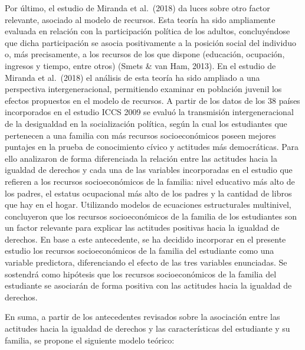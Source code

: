 \documentclass[12pt,twoside]{templates/facsothesis}
\begin{document}
Por último, el estudio de Miranda et al.~(2018) da luces sobre otro factor relevante, asociado al modelo de recursos. Esta teoría ha sido ampliamente evaluada en relación con la participación política de los adultos, concluyéndose que dicha participación se asocia positivamente a la posición social del individuo o, más precisamente, a los recursos de los que dispone (educación, ocupación, ingresos y tiempo, entre otros) (Smets \& van Ham, 2013). En el estudio de Miranda et al.~(2018) el análisis de esta teoría ha sido ampliado a una perspectiva intergeneracional, permitiendo examinar en población juvenil los efectos propuestos en el modelo de recursos. A partir de los datos de los 38 países incorporados en el estudio ICCS 2009 se evaluó la transmisión intergeneracional de la desigualdad en la socialización política, según la cual los estudiantes que pertenecen a una familia con más recursos socioeconómicos poseen mejores puntajes en la prueba de conocimiento cívico y actitudes más democráticas. Para ello analizaron de forma diferenciada la relación entre las actitudes hacia la igualdad de derechos y cada una de las variables incorporadas en el estudio que refieren a los recursos socioeconómicos de la familia: nivel educativo más alto de los padres, el estatus ocupacional más alto de los padres y la cantidad de libros que hay en el hogar. Utilizando modelos de ecuaciones estructurales multinivel, concluyeron que los recursos socioeconómicos de la familia de los estudiantes son un factor relevante para explicar las actitudes positivas hacia la igualdad de derechos. En base a este antecedente, se ha decidido incorporar en el presente estudio los recursos socioeconómicos de la familia del estudiante como una variable predictora, diferenciando el efecto de las tres variables enunciadas. Se sostendrá como hipótesis que los recursos socioeconómicos de la familia del estudiante se asociarán de forma positiva con las actitudes hacia la igualdad de derechos.

En suma, a partir de los antecedentes revisados sobre la asociación entre las actitudes hacia la igualdad de derechos y las características del estudiante y su familia, se propone el siguiente modelo teórico:

\newpage
\end{document}
